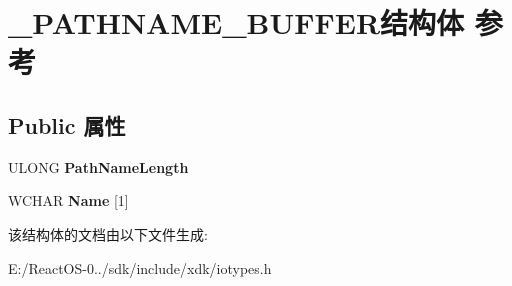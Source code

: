 \hypertarget{struct___p_a_t_h_n_a_m_e___b_u_f_f_e_r}{}\section{\+\_\+\+P\+A\+T\+H\+N\+A\+M\+E\+\_\+\+B\+U\+F\+F\+E\+R结构体 参考}
\label{struct___p_a_t_h_n_a_m_e___b_u_f_f_e_r}
\subsection*{Public 属性}
\begin{DoxyCompactItemize}
\item 
\mbox{\label{struct___p_a_t_h_n_a_m_e___b_u_f_f_e_r_a1bdaa6044f099d4a9e2cac021e401bcb}} 
U\+L\+O\+NG {\bfseries Path\+Name\+Length}
\item 
\mbox{\label{struct___p_a_t_h_n_a_m_e___b_u_f_f_e_r_a43c789a1af2fc92e346b1d421a96d017}} 
W\+C\+H\+AR {\bfseries Name} \mbox{[}1\mbox{]}
\end{DoxyCompactItemize}


该结构体的文档由以下文件生成\+:\begin{DoxyCompactItemize}
\item 
E\+:/\+React\+O\+S-\/0../sdk/include/xdk/iotypes.\+h\end{DoxyCompactItemize}
